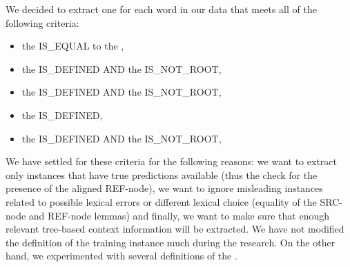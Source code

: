 We decided to extract one  for each word in our data that meets all of the following criteria:
\begin{itemize}
    \item the  IS\_EQUAL to the ,
    \item the  IS\_DEFINED AND\newline{}
        the  IS\_NOT\_ROOT,
    \item the  IS\_DEFINED AND\newline{}
        the  IS\_NOT\_ROOT,
    \item the  IS\_DEFINED,
    \item the  IS\_DEFINED AND\newline{}
        the  IS\_NOT\_ROOT,
\end{itemize}
We have settled for these criteria for the following reasons: we want to extract only instances that have true predictions
available (thus the check for the presence of the aligned REF-node), we want to ignore misleading instances related
to possible lexical errors or different lexical choice (equality of the SRC-node and REF-node lemmas)
and finally, we want to make sure that
enough relevant tree-based context information will be extracted. We have not modified the definition
of the training instance much during the research. On the other hand, we experimented with several definitions
of the .

